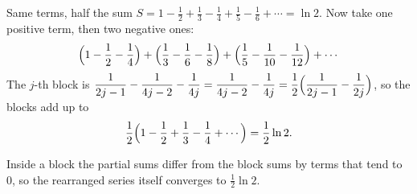 \documentclass[10pt]{wosm-slides}
\begin{document}
\begin{frame}{Same terms, half the sum}
  $S = 1 - \frac12 + \frac13 - \frac14 + \frac15 - \frac16 + \cdots = \ln 2$.
  Now take one positive term, then two negative ones:
  \[ \Bigl(1 - \frac12 - \frac14\Bigr) + \Bigl(\frac13 - \frac16 - \frac18\Bigr)
     + \Bigl(\frac15 - \frac1{10} - \frac1{12}\Bigr) + \cdots \]
  \pause
  The $j$-th block is
  $\displaystyle\frac{1}{2j-1} - \frac{1}{4j-2} - \frac{1}{4j}
   = \frac{1}{4j-2} - \frac{1}{4j} = \frac12\Bigl(\frac{1}{2j-1} - \frac{1}{2j}\Bigr)$,
  so the blocks add up to
  \[ \frac12\Bigl(1 - \frac12 + \frac13 - \frac14 + \cdots\Bigr) = \frac12 \ln 2 . \]
  \pause
  {\small Inside a block the partial sums differ from the block sums by terms that
  tend to $0$, so the rearranged series itself converges to $\frac12 \ln 2$.\par}
\end{frame}
\end{document}
